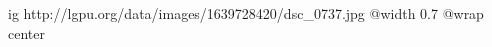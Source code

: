 
 
 
 
 

\ifcmt
  ig http://lgpu.org/data/images/1639728420/dsc_0737.jpg
  @width 0.7
	@wrap center
\fi
